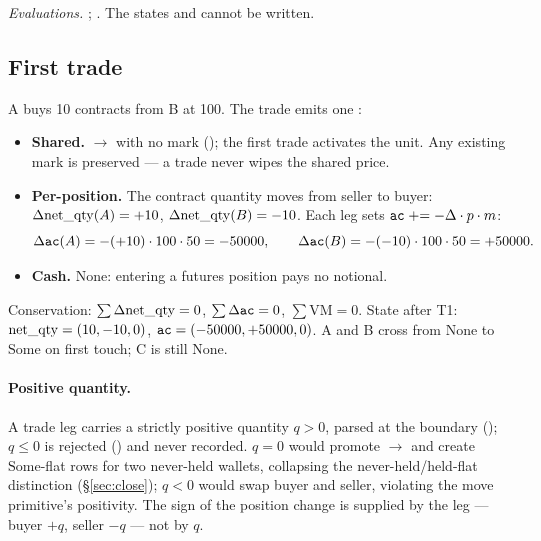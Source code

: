 {\raggedright\noindent\emph{Evaluations.}
;
. The states  and
 cannot be written.\par}

\subsection{First trade}
\label{sec:trade}

A buys 10 contracts from B at 100. The trade emits one :

\begin{itemize}
\item \textbf{Shared.}  $\to$  with no mark (); the
first trade activates the unit. Any existing mark is preserved --- a trade never wipes the shared price.
\item \textbf{Per-position.} The contract quantity moves from seller to buyer:
$\Delta\mathrm{net\_qty}(A)=+10$, $\Delta\mathrm{net\_qty}(B)=-10$. Each leg sets $\texttt{ac}\mathrel{+}=-\Delta\cdot p\cdot m$:
\[
\Delta\texttt{ac}(A) = -(+10)\cdot 100\cdot 50 = -50000,\qquad
\Delta\texttt{ac}(B) = -(-10)\cdot 100\cdot 50 = +50000.
\]
\item \textbf{Cash.} None: entering a futures position pays no notional.
\end{itemize}

\noindent Conservation: $\sum\Delta\mathrm{net\_qty} = 0$, $\sum\Delta\texttt{ac} = 0$, $\sum\mathrm{VM}=0$. State after
T1: $\mathrm{net\_qty}=(10,-10,0)$, $\texttt{ac}=(-50000,+50000,0)$. A and B cross from $\mathrm{None}$ to $\mathrm{Some}$
on first touch; C is still $\mathrm{None}$.

\paragraph{Positive quantity.} A trade leg carries a strictly positive quantity $q>0$, parsed at the
boundary (); $q\le 0$ is rejected () and never recorded. $q=0$
would promote $\to$ and create $\mathrm{Some}$-flat rows for two
never-held wallets, collapsing the never-held/held-flat distinction (\S\ref{sec:close}); $q<0$ would
swap buyer and seller, violating the move primitive's positivity. The sign of the position change is
supplied by the leg --- buyer $+q$, seller $-q$ --- not by $q$.

